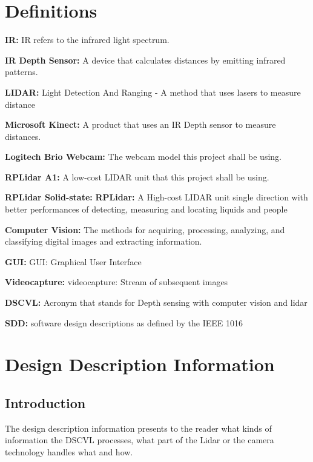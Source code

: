 \documentclass[10pt,draftclsnofoot,onecolumn,journal,compsoc]{IEEEtran}
\begin{document}
\section{Definitions}


		\textbf{IR: }\label{def:IR}
		IR refers to the infrared light spectrum.

		\textbf{IR Depth Sensor: }\label{def:depthsensor}
		A device that calculates distances by emitting infrared patterns. 
		
		\textbf{LIDAR: }\label{def:lidar}
		Light Detection And Ranging - A method that uses lasers to measure distance
		
		\textbf{Microsoft Kinect: }\label{def:kinect}
		A product that uses an IR Depth sensor to measure distances.
		
		\textbf{Logitech Brio Webcam: }\label{def:brio}
		The webcam model this project shall be using.
		
		\textbf{RPLidar A1: }\label{def:rplidar}
		A low-cost LIDAR unit that this project shall be using.
		
		\textbf{RPLidar Solid-state: }\textbf{RPLidar: }\label{def:rplidar2}
		A High-cost LIDAR unit single direction with better performances of detecting, measuring and locating liquids and people
		
		\textbf{Computer Vision: }\label{def:vision}
		The methods for acquiring, processing, analyzing, and classifying digital images and extracting information.
		
		\textbf{GUI: }\label{def:gui}
		GUI: Graphical User Interface
		
		\textbf{Videocapture: }\label{def:videocapture}
		videocapture: Stream of subsequent images
		
		\textbf{DSCVL: }\label{def:DSCVL}
		Acronym that stands for Depth sensing with computer vision and lidar
		
		\textbf{SDD: }\label{def:SDD}
		software design descriptions as defined by the IEEE 1016

\section{Design Description Information}
 
	\subsection{Introduction}
	The design description information presents to the reader what kinds of information the DSCVL processes, what part of the Lidar or the camera technology handles what and how.
    
\end{document}
